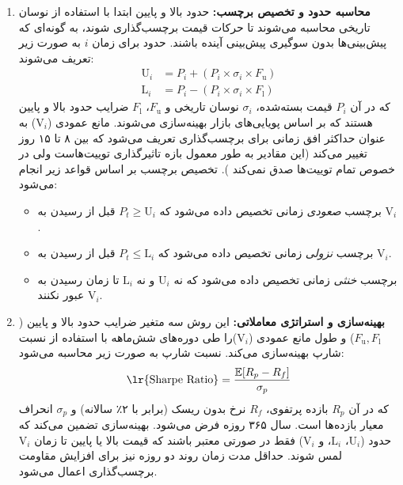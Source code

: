 \begin{enumerate}
    \item \textbf{محاسبه حدود و تخصیص برچسب:}  
    حدود بالا و پایین ابتدا با استفاده از نوسان تاریخی محاسبه می‌شوند تا حرکات قیمت برچسب‌گذاری شوند، به گونه‌ای که پیش‌بینی‌ها بدون سوگیری پیش‌بینی آینده باشند. حدود برای زمان \(i\) به صورت زیر تعریف می‌شوند:
    \begin{align}
    \text{U}_i &= P_i + (P_i \times \sigma_i \times F_\text{u}) \label{eq:upper} \\
    \text{L}_i &= P_i - (P_i \times \sigma_i \times F_\text{l}) \label{eq:lower}
    \end{align}
    که در آن \(P_i\) قیمت بسته‌شده، \(\sigma_i\) نوسان تاریخی و \(F_\text{u}\)، \(F_\text{l}\) ضرایب حدود بالا و پایین هستند که بر اساس پویایی‌های بازار بهینه‌سازی می‌شوند. مانع عمودی (\(\text{V}_i\)) به عنوان حداکثر افق زمانی برای برچسب‌گذاری تعریف می‌شود که بین ۸ تا ۱۵ روز تغییر می‌کند (این مقادیر به طور معمول بازه تاثیر‌گذاری توییت‌هاست ولی در خصوص تمام توییت‌ها صدق نمی‌کند \cite{twitter_vallecruz_2021}). تخصیص برچسب بر اساس قواعد زیر انجام می‌شود:
    \begin{itemize}
        \item برچسب \textit{صعودی} زمانی تخصیص داده می‌شود که \(P_t \geq \text{U}_i\) قبل از رسیدن به \(\text{V}_i\).
        \item برچسب \textit{نزولی} زمانی تخصیص داده می‌شود که \(P_t \leq \text{L}_i\) قبل از رسیدن به \(\text{V}_i\).
        \item برچسب \textit{خنثی} زمانی تخصیص داده می‌شود که نه \(\text{U}_i\) و نه \(\text{L}_i\) تا زمان رسیدن به \(\text{V}_i\) عبور نکنند.
    \end{itemize}

    \item \textbf{بهینه‌سازی و استراتژی معاملاتی:}  
    این روش سه متغیر ضرایب حدود بالا و پایین (\(F_\text{u}, F_\text{l}\)) و طول مانع عمودی (\(\text{V}_i\))را طی دوره‌های شش‌ماهه با استفاده از نسبت شارپ بهینه‌سازی می‌کند. نسبت شارپ به صورت زیر محاسبه می‌شود:
    \begin{align}
    \text{\lr{Sharpe Ratio}} = \frac{\mathbb{E}[R_p - R_f]}{\sigma_p}
    \label{eq:sharpe}
    \end{align}
    که در آن \(R_p\) بازده پرتفوی، \(R_f\) نرخ بدون ریسک (برابر با ۲٪ سالانه) و \(\sigma_p\) انحراف معیار بازده‌ها است. سال ۳۶۵ روزه فرض می‌شود. بهینه‌سازی تضمین می‌کند که حدود (\(\text{U}_i\)، \(\text{L}_i\)، و \(\text{V}_i\)) فقط در صورتی معتبر باشند که قیمت بالا یا پایین تا زمان \(\text{V}_i\) لمس شوند. حداقل مدت زمان روند دو روزه نیز برای افزایش مقاومت برچسب‌گذاری اعمال می‌شود.
\end{enumerate}

